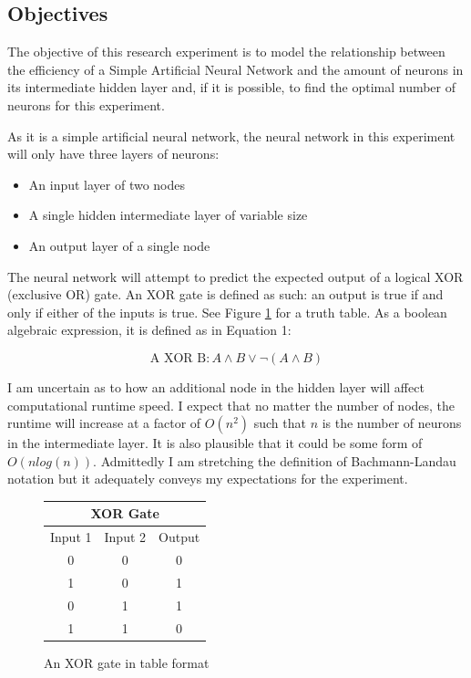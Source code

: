 \documentclass[12pt]{article}
\begin{document}
\subsection{Objectives \label{objectives}}

The objective of this research experiment is to model the relationship between the efficiency of a Simple Artificial Neural Network and the amount of neurons in its intermediate hidden layer and, if it is possible, to find the optimal number of neurons for this experiment.

As it is a simple artificial neural network, the neural network in this experiment will only have three layers of neurons:

\begin{itemize}
    \item An input layer of two nodes
    \item A single hidden intermediate layer of variable size
    \item An output layer of a single node
\end{itemize}

The neural network will attempt to predict the expected output of a logical XOR (exclusive OR) gate. An XOR gate is defined as such: an output is true if and only if either of the inputs is true. See Figure \ref{xortable} for a truth table. As a boolean algebraic expression, it is defined as in Equation 1:

\begin{equation}
    \textrm{A XOR B}: A \wedge B \vee \neg(A \wedge B)
\end{equation}

I am uncertain as to how an additional node in the hidden layer will affect computational runtime speed. I expect that no matter the number of nodes, the runtime will increase at a factor of $O(n^2)$ such that $n$ is the number of neurons in the intermediate layer. It is also plausible that it could be some form of $O(nlog(n))$. Admittedly I am stretching the definition of Bachmann-Landau notation but it adequately conveys my expectations for the experiment.

\begin{figure}[h]
    \begin{center}
        \begin{tabular}{|c|c|c|}
            \hline
            \multicolumn{3}{|c|}{XOR Gate} \\
            \hline
            Input 1 & Input 2 & Output     \\
            \hline
            0       & 0       & 0          \\
            1       & 0       & 1          \\
            0       & 1       & 1          \\
            1       & 1       & 0          \\
            \hline
        \end{tabular}
    \end{center}
    \caption{An XOR gate in table format \label{xortable}}
\end{figure}
\end{document}
